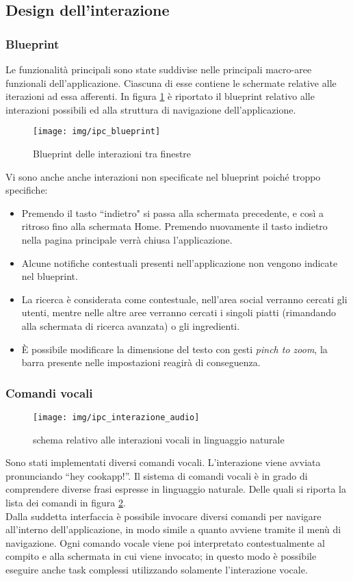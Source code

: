 \subsection{Design dell'interazione}

\subsubsection{Blueprint}
Le funzionalità principali sono state suddivise nelle principali macro-aree
funzionali dell'applicazione.  Ciascuna di esse contiene le schermate
relative alle iterazioni ad essa afferenti.  In figura \ref{fig:blueprint}
è riportato il blueprint relativo alle interazioni possibili ed alla struttura
di navigazione dell'applicazione.
\begin{figure}[H]
	\centering
	\caption{Blueprint delle interazioni tra finestre}
	\texttt{[image: img/ipc\_blueprint]}
	\label{fig:blueprint}
\end{figure}
Vi sono anche anche interazioni non specificate nel blueprint poiché troppo
specifiche:
\begin{itemize}
	\item Premendo il tasto ``indietro" si passa alla
	schermata precedente, e così a ritroso fino alla schermata Home.
	Premendo nuovamente il tasto indietro nella pagina principale
	verrà chiusa l'applicazione.
	\item Alcune notifiche contestuali presenti nell'applicazione non
	vengono indicate nel blueprint.
	\item La ricerca è considerata come contestuale, nell'area social
	verranno cercati gli utenti, mentre nelle altre aree verranno cercati i
	singoli piatti (rimandando alla schermata di ricerca avanzata)
	o gli ingredienti.
	\item È possibile modificare la dimensione del testo con gesti \emph{pinch to
	zoom}, la barra presente nelle impostazioni reagirà di conseguenza.
\end{itemize}

\subsubsection{Comandi vocali}
\begin{figure}[H]
	\texttt{[image: img/ipc\_interazione\_audio]}
	\caption{schema relativo alle interazioni vocali in linguaggio naturale}
	\label{fig:ipcvocali}
\end{figure}
Sono stati implementati diversi comandi vocali.  L'interazione viene avviata
pronunciando ``hey cookapp!''.  Il sistema di comandi vocali è in grado di
comprendere diverse frasi espresse in linguaggio naturale.  Delle quali si riporta
la lista dei comandi in figura \ref{fig:ipcvocali}.\\
Dalla suddetta interfaccia è possibile invocare diversi comandi per navigare
all'interno dell'applicazione, in modo simile a quanto avviene tramite il menù
di navigazione.  Ogni comando vocale viene poi interpretato contestualmente al compito e alla
schermata in cui viene invocato; in questo modo è possibile eseguire anche task complessi
utilizzando solamente l'interazione vocale.

